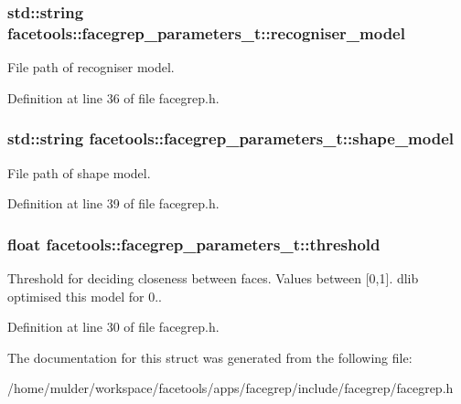 \subsubsection[{\texorpdfstring{recogniser\+\_\+model}{recogniser_model}}]{\setlength{\rightskip}{0pt plus 5cm}std\+::string facetools\+::facegrep\+\_\+parameters\+\_\+t\+::recogniser\+\_\+model}\hypertarget{structfacetools_1_1facegrep__parameters__t_a1375ef2f7de876c38ae3fe42be232941}{}\label{structfacetools_1_1facegrep__parameters__t_a1375ef2f7de876c38ae3fe42be232941}
File path of recogniser model. 

Definition at line 36 of file facegrep.\+h.

\subsubsection[{\texorpdfstring{shape\+\_\+model}{shape_model}}]{\setlength{\rightskip}{0pt plus 5cm}std\+::string facetools\+::facegrep\+\_\+parameters\+\_\+t\+::shape\+\_\+model}\hypertarget{structfacetools_1_1facegrep__parameters__t_ad568674483df43373dde53e1373cd8f7}{}\label{structfacetools_1_1facegrep__parameters__t_ad568674483df43373dde53e1373cd8f7}
File path of shape model. 

Definition at line 39 of file facegrep.\+h.

\subsubsection[{\texorpdfstring{threshold}{threshold}}]{\setlength{\rightskip}{0pt plus 5cm}float facetools\+::facegrep\+\_\+parameters\+\_\+t\+::threshold}\hypertarget{structfacetools_1_1facegrep__parameters__t_aebb328a0601c2d3b3361ea9f25a775b0}{}\label{structfacetools_1_1facegrep__parameters__t_aebb328a0601c2d3b3361ea9f25a775b0}
Threshold for deciding closeness between faces. Values between \mbox{[}0,1\mbox{]}. dlib optimised this model for 0.. 

Definition at line 30 of file facegrep.\+h.



The documentation for this struct was generated from the following file\+:\begin{DoxyCompactItemize}
\item 
/home/mulder/workspace/facetools/apps/facegrep/include/facegrep/facegrep.\+h\end{DoxyCompactItemize}
